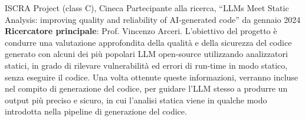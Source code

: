 
\begin{cventries}
	\cventry
	{ISCRA Project (class C), Cineca}
	{Partecipante alla ricerca, \textquotedblleft{LLMs Meet Static Analysis: improving quality and reliability of AI‑generated code}\textquotedblright}
	{}
	{da gennaio 2024}
	{ \textbf{Ricercatore principale}: Prof. Vincenzo Arceri. L'obiettivo del progetto è condurre una valutazione approfondita della qualità e della sicurezza del codice generato con alcuni dei più popolari LLM open-source utilizzando analizzatori statici, in grado di rilevare vulnerabilità ed errori di run-time in modo statico, senza eseguire il codice. Una volta ottenute queste informazioni, verranno incluse nel compito di generazione del codice, per guidare l'LLM stesso a produrre un output più preciso e sicuro, in cui l'analisi statica viene in qualche modo introdotta nella pipeline di generazione del codice. }

\end{cventries}
